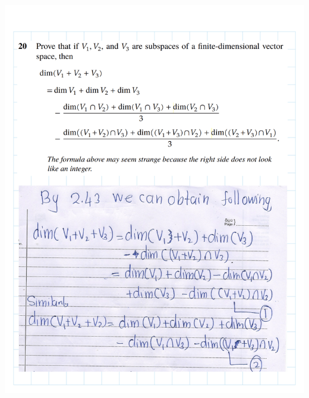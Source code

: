 \documentclass[
]{book}
\theoremstyle{definition}
\theoremstyle{definition}
\theoremstyle{definition}
\theoremstyle{definition}
\theoremstyle{remark}
\begin{document}
\includegraphics{fig/Ex 2B and 2C/Ex 2c (54).png}

  
\end{document}
